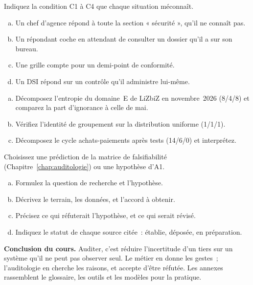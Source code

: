 \begin{boxexo}[title={\ding{45}\quad Exercice~22.1. Quelle condition~? \niveaubase}]
Indiquez la condition C1 à C4 que chaque situation méconnaît.
\begin{enumerate}[(a)]
    \item Un chef d'agence répond \NEK{} à toute la section « sécurité »,
          qu'il ne connaît pas.
    \item Un répondant coche \NEK{} en attendant de consulter un dossier
          qu'il a sur son bureau.
    \item Une grille compte \NEK{} pour un demi-point de conformité.
    \item Un DSI répond \NEK{} sur un contrôle qu'il administre lui-même.
\end{enumerate}
\end{boxexo}

\begin{boxexo}[title={\ding{45}\quad Exercice~22.2. Décomposer l'entropie \niveaumoyen}]
\begin{enumerate}[(a)]
    \item Décomposez l'entropie du domaine~E de LiZbiZ en novembre~2026
          (8/4/8) et comparez la part d'ignorance à celle de mai.
    \item Vérifiez l'identité de groupement sur la distribution uniforme
          (1/1/1).
    \item Décomposez le cycle achats-paiements après tests (14/6/0) et
          interprétez.
\end{enumerate}
\end{boxexo}

\begin{boxexo}[title={\ding{45}\quad Exercice~22.3. Préparer un sujet de mémoire \niveauexpert}]
Choisissez une prédiction de la matrice de falsifiabilité
(Chapitre~\ref{chap:auditologie}) ou une hypothèse d'A1.
\begin{enumerate}[(a)]
    \item Formulez la question de recherche et l'hypothèse.
    \item Décrivez le terrain, les données, et l'accord à obtenir.
    \item Précisez ce qui réfuterait l'hypothèse, et ce qui serait révisé.
    \item Indiquez le statut de chaque source citée~: établie, déposée, en
          préparation.
\end{enumerate}
\end{boxexo}

\bigskip

\begin{boxinfo}
\textbf{Conclusion du cours.} Auditer, c'est réduire l'incertitude d'un
tiers sur un système qu'il ne peut pas observer seul. Le métier en donne
les gestes~; l'auditologie en cherche les raisons, et accepte d'être
réfutée. Les annexes rassemblent le glossaire, les outils et les modèles
pour la pratique.
\end{boxinfo}
